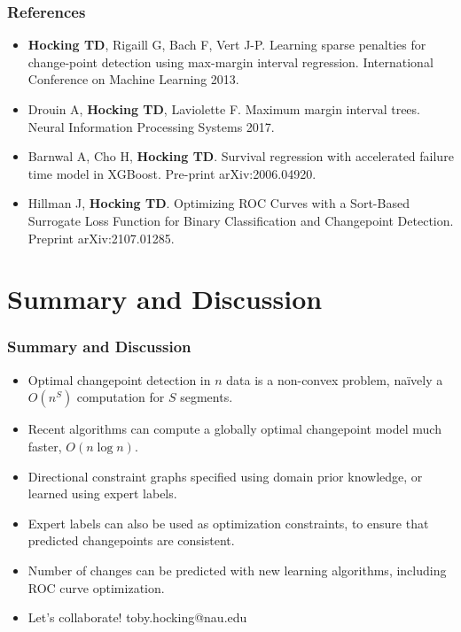 \documentclass{beamer}
\begin{document}
\begin{frame}
  \frametitle{References}
  \scriptsize
  \begin{itemize}
  \item \textbf{Hocking TD}, Rigaill G, Bach F, Vert J-P. Learning
    sparse penalties for change-point detection using max-margin
    interval regression. International Conference on Machine Learning
    2013.
  \item Drouin A, \textbf{Hocking TD}, Laviolette F. Maximum margin interval
    trees. Neural Information Processing Systems 2017.
  \item Barnwal A, Cho H, \textbf{Hocking TD}. Survival regression with
    accelerated failure time model in XGBoost. Pre-print
    arXiv:2006.04920.
  \item Hillman J, \textbf{Hocking TD}. Optimizing ROC Curves with a
    Sort-Based Surrogate Loss Function for Binary Classification and
    Changepoint Detection. Preprint arXiv:2107.01285.
  \end{itemize}
\end{frame}

\section{Summary and Discussion}

\begin{frame}[fragile]
  \frametitle{Summary and Discussion}

  \begin{itemize}
  \item Optimal changepoint detection in $n$ data is a non-convex
    problem, na\" ively a $O(n^S)$ computation for $S$ segments.
  \item Recent algorithms can compute a globally optimal changepoint
    model much faster, $O(n\log n)$.
  \item Directional constraint graphs specified using domain prior
    knowledge, or learned using expert labels.
  \item Expert labels can also be used as optimization constraints, to
    ensure that predicted changepoints are consistent.
  \item Number of changes can be predicted with new learning
    algorithms, including ROC curve optimization.
  \item Let's collaborate! toby.hocking@nau.edu
  \end{itemize}
  
\end{frame}
\end{document}
